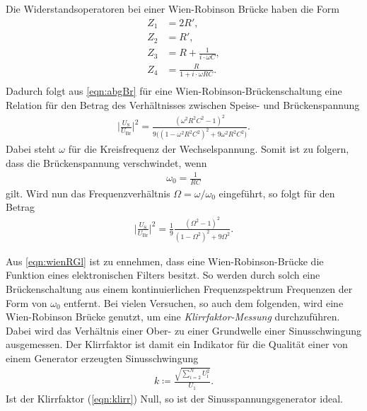 \sloppy
Die Widerstandsoperatoren bei einer Wien-Robinson Brücke haben die Form
\begin{align*}
    Z_1 &= 2R', \\
    Z_2 &= R' , \\
    Z_3 &= R + \frac{1}{i\cdot\omega C} , \\
    Z_4 &= \frac{R}{1+i\cdot\omega RC} . \\
\end{align*}
Dadurch folgt aus \autoref{eqn:abgBr} für eine Wien-Robinson-Brückenschaltung eine Relation für den Betrag des Verhältnisses
zwischen Speise- und Brückenspannung
\begin{align}
    \Bigg|\frac{U_{\text{S}}}{U_{\text{Br}}}\Bigg|^2 = \frac{(\omega^2 R^2C^2-1)^2}{9\Big((1-\omega^2R^2C^2)^2 + 9\omega^2R^2C^2\Big)}.
    \label{eqn:theo}
\end{align}
Dabei steht $\omega$ für die Kreisfrequenz der Wechselspannung.
Somit ist zu folgern, dass die Brückenspannung verschwindet, wenn 
\begin{align*}
    \omega_0 = \frac{1}{RC}
\end{align*}
gilt. Wird nun das Frequenzverhältnis $\Omega = \omega/\omega_0$ eingeführt, so folgt für den Betrag
\begin{align}
    \Bigg|\frac{U_{\text{S}}}{U_{\text{Br}}}\Bigg|^2 = \frac 19 \frac{(\Omega^2-1)^2}{(1-\Omega^2)^2+9\Omega^2}.
    \label{eqn:wienRGl}
\end{align}

Aus \autoref{eqn:wienRGl} ist zu ennehmen, dass eine Wien-Robinson-Brücke die Funktion eines elektronischen Filters besitzt.
So werden durch solch eine Brückenschaltung aus einem kontinuierlichen Frequenzspektrum Frequenzen der Form von $\omega_0$
entfernt. 
Bei vielen Versuchen, so auch dem folgenden, wird eine Wien-Robinson Brücke genutzt, um eine \textit{Klirrfaktor-Messung}
durchzuführen. Dabei wird das Verhältnis einer Ober- zu einer Grundwelle einer Sinusschwingung ausgemessen. Der Klirrfaktor
ist damit ein Indikator für die Qualität einer von einem Generator erzeugten Sinusschwingung
\begin{align}
    k \coloneq \frac{\sqrt{\sum_{i=2}^N U_{\text{i}}^2}}{U_1}.
    \label{eqn:klirr}
\end{align}
Ist der Klirrfaktor (\ref{eqn:klirr}) Null, so ist der Sinusspannungsgenerator ideal.